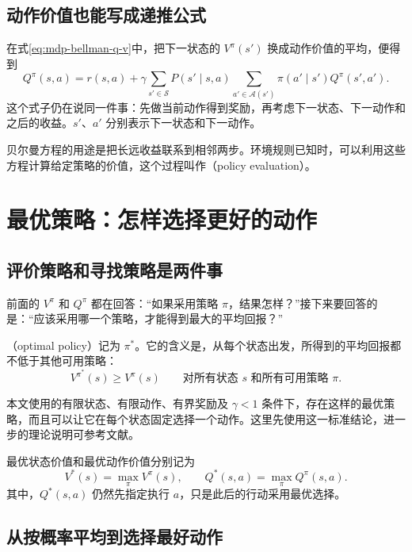 \documentclass[UTF8]{ctexart}
\begin{document}
\subsection{动作价值也能写成递推公式}

在式\eqref{eq:mdp-bellman-q-v}中，把下一状态的 $V^\pi(s')$ 换成动作价值的平均，便得到
\begin{equation}
  Q^\pi(s,a)=r(s,a)+\gamma\sum_{s'\in\mathcal S}P(s'\mid s,a)
  \sum_{a'\in\mathcal A(s')}\pi(a'\mid s')Q^\pi(s',a').
  \label{eq:mdp-bellman-q}
\end{equation}
这个式子仍在说同一件事：先做当前动作得到奖励，再考虑下一状态、下一动作和之后的收益。$s'$、$a'$ 分别表示下一状态和下一动作。

贝尔曼方程的用途是把长远收益联系到相邻两步。环境规则已知时，可以利用这些方程计算给定策略的价值，这个过程叫作（policy evaluation）。

\section{最优策略：怎样选择更好的动作}
\label{sec:mdp-optimal}

\subsection{评价策略和寻找策略是两件事}

前面的 $V^\pi$ 和 $Q^\pi$ 都在回答：“如果采用策略 $\pi$，结果怎样？”接下来要回答的是：“应该采用哪一个策略，才能得到最大的平均回报？”

（optimal policy）记为 $\pi^*$。它的含义是，从每个状态出发，所得到的平均回报都不低于其他可用策略：
\begin{equation}
  V^{\pi^*}(s)\geq V^\pi(s)
  \qquad\text{对所有状态 }s\text{ 和所有可用策略 }\pi.
  \label{eq:mdp-optimal-policy}
\end{equation}

本文使用的有限状态、有限动作、有界奖励及 $\gamma<1$ 条件下，存在这样的最优策略，而且可以让它在每个状态固定选择一个动作。这里先使用这一标准结论，进一步的理论说明可参考文献\cite{sutton-barto}。

最优状态价值和最优动作价值分别记为
\begin{equation}
  V^*(s)=\max_\pi V^\pi(s),
  \qquad Q^*(s,a)=\max_\pi Q^\pi(s,a).
  \label{eq:mdp-optimal-value}
\end{equation}
其中，$Q^*(s,a)$ 仍然先指定执行 $a$，只是此后的行动采用最优选择。

\subsection{从按概率平均到选择最好动作}
\end{document}
